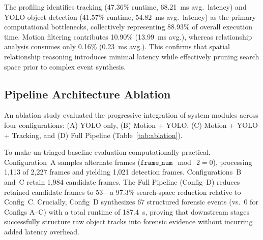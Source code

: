 The profiling identifies tracking (47.36\% runtime, 68.21~ms avg.~latency) and YOLO object detection (41.57\% runtime, 54.82~ms avg.~latency) as the primary computational bottlenecks, collectively representing 88.93\% of overall execution time. Motion filtering contributes 10.90\% (13.99~ms avg.), whereas relationship analysis consumes only 0.16\% (0.23~ms avg.). This confirms that spatial relationship reasoning introduces minimal latency while effectively pruning search space prior to complex event synthesis.

\subsection{Pipeline Architecture Ablation}

An ablation study evaluated the progressive integration of system modules across four configurations: (A) YOLO only, (B) Motion + YOLO, (C) Motion + YOLO + Tracking, and (D) Full Pipeline (Table~\ref{tab:ablation}).

\begin{table}[t]
\centering
\caption{Ablation study of the proposed pipeline architecture.}
\label{tab:ablation}
\end{table}

To make un-triaged baseline evaluation computationally practical, Configuration~A samples alternate frames ($\texttt{frame\_num}~\bmod~2=0$), processing 1,113 of 2,227 frames and yielding 1,021 detection frames. Configurations~B and~C retain 1,984 candidate frames. The Full Pipeline (Config~D) reduces retained candidate frames to 53---a 97.3\% search-space reduction relative to Config~C. Crucially, Config~D synthesizes 67 structured forensic events (vs.~0 for Configs A--C) with a total runtime of 187.4~s, proving that downstream stages successfully structure raw object tracks into forensic evidence without incurring added latency overhead.

